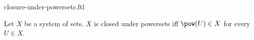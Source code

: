 \documentclass{naproche-library}
\begin{document}
\begin{smodule}[title=Closure Under Powersets]{closure-under-powersets.ftl}

\begin{definition}[forthel,id=FOUNDATIONS_14_4652013578120594]
  Let $X$ be a system of sets.
  $X$ is closed under powersets iff $\pow(U) \in X$ for every $U \in X$.
\end{definition}
\end{smodule}
\end{document}
